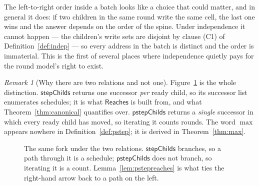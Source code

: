 \documentclass[11pt,a4paper]{article}
\theoremstyle{definition}
\theoremstyle{plain}
\theoremstyle{remark}
\newtheorem{remark}[definition]{Remark}
\newcommand{\pstep}{\mathsf{pstep}}
\newcommand{\Reaches}{\mathsf{Reaches}}
\begin{document}
The left-to-right order inside a batch looks like a choice that could matter, and in general it
does: if two children in the same round write the same cell, the last one wins and the answer
depends on the order of the spine. Under independence it cannot happen --- the children's write
sets are disjoint by clause (C1) of Definition~\ref{def:indep} --- so every address in the
batch is distinct and the order is immaterial. This is the first of several places where
independence quietly pays for the round model's right to exist.

\begin{remark}[Why there are two relations and not one]\label{rem:tworelations}
Figure~\ref{fig:roundvsstep} is the whole distinction. $\mathsf{stepChilds}$ returns one
successor \emph{per} ready child, so its successor list enumerates schedules; it is what
$\Reaches$ is built from, and what Theorem~\ref{thm:canonical} quantifies over.
$\pstep\mathsf{Childs}$ returns a \emph{single} successor in which every ready child has moved,
so iterating it counts rounds. The word $\max$ appears nowhere in
Definition~\ref{def:pstep}; it is derived in Theorem~\ref{thm:max}.
\end{remark}

\begin{figure}[htb]
\centering
{}
\caption{The same fork under the two relations. $\mathsf{stepChilds}$ branches, so a path
through it is a schedule; $\pstep\mathsf{Childs}$ does not branch, so iterating it is a count.
Lemma~\ref{lem:pstepreaches} is what ties the right-hand arrow back to a path on the
left.}\label{fig:roundvsstep}
\end{figure}
\end{document}
